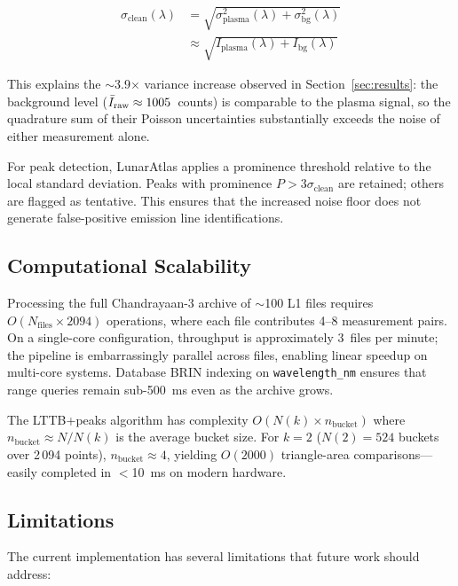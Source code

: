\documentclass[a4paper,twocolumn,10pt]{article}
\begin{document}
\begin{equation}
\label{eq:uncertainty}
\begin{split}
\sigma_{\text{clean}}(\lambda) &=
  \sqrt{\sigma_{\text{plasma}}^2(\lambda)
  + \sigma_{\text{bg}}^2(\lambda)} \\
  &\approx \sqrt{I_{\text{plasma}}(\lambda)
  + I_{\text{bg}}(\lambda)}
\end{split}
\end{equation}

This explains the $\sim$3.9$\times$ variance increase observed in
Section~\ref{sec:results}: the background level ($\bar{I}_{\rm raw}
\approx 1005$~counts) is comparable to the plasma signal, so
the quadrature sum of their Poisson uncertainties substantially
exceeds the noise of either measurement alone.

For peak detection, LunarAtlas applies a prominence threshold
relative to the local standard deviation.  Peaks with prominence
$P > 3\sigma_{\text{clean}}$ are retained; others are flagged as
tentative.  This ensures that the increased noise floor does not
generate false-positive emission line identifications.

\subsection{Computational Scalability}

Processing the full Chandrayaan-3 archive of $\sim$100 L1 files
requires $O(N_{\text{files}} \times 2094)$ operations, where each
file contributes 4--8 measurement pairs.  On a single-core
configuration, throughput is approximately 3~files per minute;
the pipeline is embarrassingly parallel across files, enabling
linear speedup on multi-core systems.  Database BRIN indexing
on \texttt{wavelength\_nm} ensures that range queries remain
sub-\SI{500}{\milli\second} even as the archive grows.

The LTTB+peaks algorithm has complexity $O(N(k) \times n_{\text{bucket}})$
where $n_{\text{bucket}} \approx N / N(k)$ is the average bucket size.
For $k=2$ ($N(2) = 524$ buckets over 2\,094 points),
$n_{\text{bucket}} \approx 4$, yielding $O(2000)$ triangle-area
comparisons---easily completed in $<$10~ms on modern hardware.

\subsection{Limitations}

The current implementation has several limitations that future work
should address:
\end{document}
